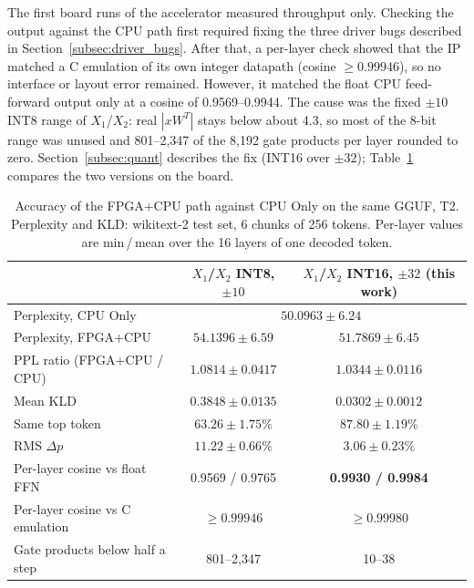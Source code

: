 The first board runs of the accelerator measured throughput only. Checking the output
against the CPU path first required fixing the three driver bugs described in
Section~\ref{subsec:driver_bugs}. After that, a per-layer check showed that
the IP matched a C emulation of its own integer datapath (cosine $\geq 0.99946$), so no
interface or layout error remained. However, it matched the float CPU feed-forward
output only at a cosine of 0.9569--0.9944. The cause was the fixed $\pm 10$ INT8 range
of $X_1$/$X_2$: real $|xW^T|$ stays below about 4.3, so most of the 8-bit range was
unused and 801--2,347 of the 8,192 gate products per layer rounded to zero.
Section~\ref{subsec:quant} describes the fix (INT16 over $\pm 32$);
Table~\ref{tab:accuracy} compares the two versions on the board.

\begin{table}[htbp]
\centering
\footnotesize
\caption{Accuracy of the FPGA+CPU path against CPU Only on the same GGUF, T2.
Perplexity and KLD: wikitext-2 test set, 6 chunks of 256 tokens. Per-layer values are
min\,/\,mean over the 16 layers of one decoded token.}
\label{tab:accuracy}
\begin{tabular}{l c c}
\hline
 & $X_1$/$X_2$ INT8, $\pm 10$ & $X_1$/$X_2$ INT16, $\pm 32$ (this work) \\
\hline
Perplexity, CPU Only            & \multicolumn{2}{c}{$50.0963 \pm 6.24$} \\
Perplexity, FPGA+CPU            & $54.1396 \pm 6.59$ & $\mathbf{51.7869 \pm 6.45}$ \\
PPL ratio (FPGA+CPU / CPU)      & $1.0814 \pm 0.0417$ & $\mathbf{1.0344 \pm 0.0116}$ \\
Mean KLD                        & $0.3848 \pm 0.0135$ & $\mathbf{0.0302 \pm 0.0012}$ \\
Same top token                  & $63.26 \pm 1.75\%$ & $\mathbf{87.80 \pm 1.19\%}$ \\
RMS $\Delta p$                  & $11.22 \pm 0.66\%$ & $\mathbf{3.06 \pm 0.23\%}$ \\
\hline
Per-layer cosine vs float FFN   & 0.9569 / 0.9765 & \textbf{0.9930 / 0.9984} \\
Per-layer cosine vs C emulation & $\geq 0.99946$ & $\geq 0.99980$ \\
Gate products below half a step & 801--2,347 & 10--38 \\
\hline
\end{tabular}
\end{table}

